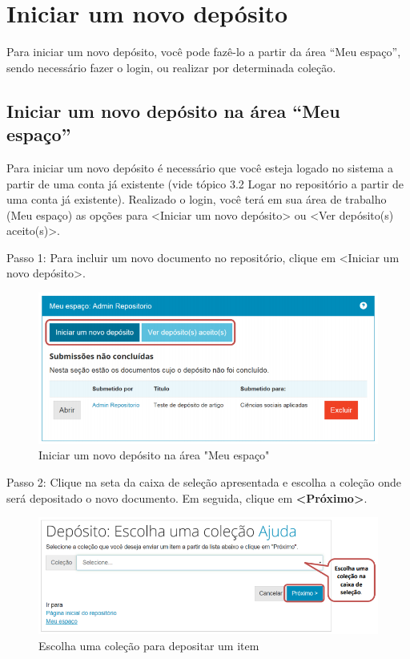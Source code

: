 \documentclass[12pt,hidelinks]{article}
\begin{document}
\newpage        
\section{Iniciar um novo depósito}
\newpage
    
    Para iniciar um novo depósito, você pode fazê-lo a partir da área “Meu espaço”, sendo necessário fazer o login, ou realizar por determinada coleção. 
    
    \subsection{Iniciar um novo depósito na área “Meu espaço”}
    
    \singlespacing
    
    Para iniciar um novo depósito é necessário que você esteja logado no sistema a partir de uma conta já existente (vide tópico 3.2 Logar no repositório a partir de uma conta já existente). Realizado o login, você terá em sua área de trabalho (Meu espaço) as opções para <Iniciar um novo depósito> ou <Ver depósito(s) aceito(s)>.
    
    \singlespacing
    
    Passo 1: Para incluir um novo documento no repositório, clique em <Iniciar um novo depósito>.
    
    \begin{figure}[!htp]
                \centering
                \includegraphics[scale=0.8]{figura/Figura134.png}
                \caption{Iniciar um novo depósito na área "Meu espaço"}
            \label{Rotulo}
        \end{figure}
    
    Passo 2: Clique na seta da caixa de seleção apresentada e escolha a coleção onde será depositado o novo documento. Em seguida, clique em \textbf{<Próximo>}.
    
    \begin{figure}[!htp]
                \centering
                \includegraphics[scale=0.8]{figura/Figura135.png}
                \caption{Escolha uma coleção para depositar um item}
            \label{Rotulo}
        \end{figure}
\end{document}
